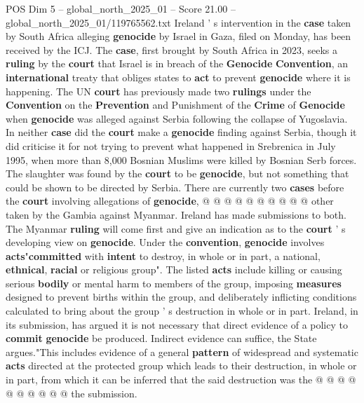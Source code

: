 \begin{textsample}{POS Dim 5 – global\_north\_2025\_01 – Score 21.00 – global\_north\_2025\_01/119765562.txt}  \label{ex:f5_pos_262}
Ireland ' s intervention in the \textbf{case} taken by South Africa alleging \textbf{genocide} by Israel in Gaza, filed on Monday, has been received by the ICJ.
The \textbf{case}, first brought by South Africa in 2023, seeks a \textbf{ruling} by the \textbf{court} that Israel is in breach of the \textbf{Genocide} \textbf{Convention}, an \textbf{international} treaty that obliges states to \textbf{act} to prevent \textbf{genocide} where it is happening.
The UN \textbf{court} has previously made two \textbf{rulings} under the \textbf{Convention} on the \textbf{Prevention} and Punishment of the \textbf{Crime} of \textbf{Genocide} when \textbf{genocide} was alleged against Serbia following the collapse of Yugoslavia.
In neither \textbf{case} did the \textbf{court} make a \textbf{genocide} finding against Serbia, though it did criticise it for not trying to prevent what happened in Srebrenica in July 1995, when more than 8,000 Bosnian Muslims were killed by Bosnian Serb forces.
The slaughter was found by the \textbf{court} to be \textbf{genocide}, but not something that could be shown to be directed by Serbia.
There are currently two \textbf{cases} before the \textbf{court} involving allegations of \textbf{genocide}, @ @ @ @ @ @ @ @ @ @ other taken by the Gambia against Myanmar.
Ireland has made submissions to both.
The Myanmar \textbf{ruling} will come first and give an indication as to the \textbf{court} ' s developing view on \textbf{genocide}.
Under the \textbf{convention}, \textbf{genocide} involves \textbf{acts}"\textbf{committed} with \textbf{intent} to destroy, in whole or in part, a national, \textbf{ethnical}, \textbf{racial} or religious group".
The listed \textbf{acts} include killing or causing serious \textbf{bodily} or mental harm to members of the group, imposing \textbf{measures} designed to prevent births within the group, and deliberately inflicting conditions calculated to bring about the group ' s destruction in whole or in part.
Ireland, in its submission, has argued it is not necessary that direct evidence of a policy to \textbf{commit} \textbf{genocide} be produced.
Indirect evidence can suffice, the State argues."This includes evidence of a general \textbf{pattern} of widespread and systematic \textbf{acts} directed at the protected group which leads to their destruction, in whole or in part, from which it can be inferred that the said destruction was the @ @ @ @ @ @ @ @ @ @ the submission.

\end{textsample}
